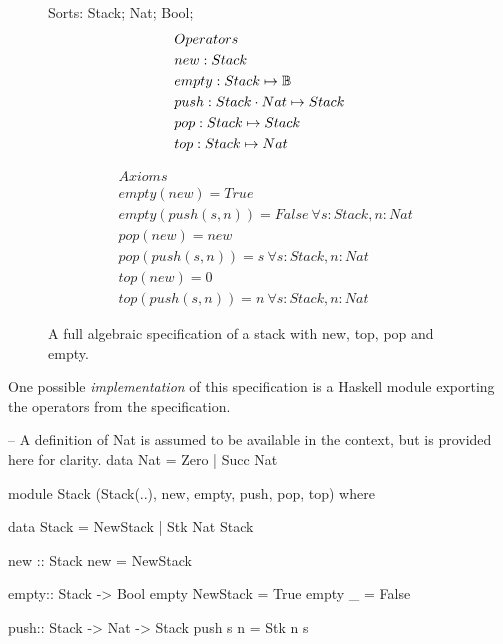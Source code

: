 {\begin{figure*}
\begin{minipage}[t]{.3\linewidth}
Sorts: Stack; Nat; Bool;
\begin{align*}
& Operators \\
& new : Stack \\
& empty : Stack \mapsto \mathbb{B} \\
& push : Stack \cdot Nat \mapsto Stack \\
& pop : Stack \mapsto Stack\\
& top : Stack \mapsto Nat
\end{align*}
\end{minipage}
\begin{minipage}[t]{.1\linewidth}
\end{minipage}
\begin{minipage}[t]{.6\linewidth}
\begin{align*}
& Axioms \\
& empty( new ) = True \\
&empty ( push( s, n ) ) = False\  \forall s:Stack, n:Nat\\
& pop( new ) = new \\
& pop( push( s, n ) ) = s \  \forall s:Stack, n:Nat\\
& top( new ) = 0 \\
& top ( push( s, n ) ) = n\  \forall s:Stack, n:Nat
\end{align*}
\end{minipage}
\caption[Algebraic specification of a stack]
{A full algebraic specification of a stack with new, top, pop and empty.}
\label{full_list_spec_ex}
\end{figure*}

One possible \emph{implementation} of this specification 
is a Haskell module exporting the operators from the specification.

\begin{code}
-- A definition of Nat is assumed to be available in the context, but is provided here for clarity.
data Nat = Zero | Succ Nat 

module Stack (Stack(..), new, empty, push, pop, top) where

data Stack = NewStack | Stk Nat Stack 

new :: Stack
new = NewStack

empty:: Stack -> Bool
empty NewStack = True
empty _ = False

push:: Stack -> Nat -> Stack
push s n = Stk n s


\end{code}}

